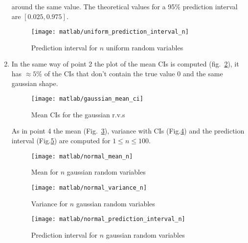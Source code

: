 \documentclass{article}
\begin{document}
\begin{enumerate}
  around the same value. The theoretical values for a 95\% prediction
  interval are $[0.025, 0.975]$.
  \begin{figure}[h]
    \centering
    \texttt{[image: matlab/uniform\_prediction\_interval\_n]}
    \caption{Prediction interval for $n$ uniform random variables}
    \label{pred_int_unif}
  \end{figure}
\item In the same way of point 2 the plot of the mean CIs is computed
  (fig.~\ref{gaussian_mean_ci}), it has $\approx 5\%$ of the CIs that
  don't contain the true value 0 and the same gaussian shape.
  \begin{figure}[h]
    \centering
    \texttt{[image: matlab/gaussian\_mean\_ci]}
    \caption{Mean CIs for the gaussian r.v.s}
    \label{gaussian_mean_ci}
  \end{figure}

  As in point 4 the mean (Fig.~\ref{gaussian_mean_n}), variance with
  CIs (Fig.\ref{gaussian_var_n}) and the prediction interval
  (Fig.\ref{gaussian_pred_int_n}) are computed for $1 \leq n \leq 100$.
  \begin{figure}[h]
    \centering
    \texttt{[image: matlab/normal\_mean\_n]}
    \caption{Mean for $n$ gaussian random variables}
    \label{gaussian_mean_n}
  \end{figure}
  \begin{figure}[h]
    \centering
    \texttt{[image: matlab/normal\_variance\_n]}
    \caption{Variance for $n$ gaussian random variables}
    \label{gaussian_var_n}
  \end{figure}
    \begin{figure}[h]
    \centering
    \texttt{[image: matlab/normal\_prediction\_interval\_n]}
    \caption{Prediction interval for $n$ gaussian random variables}
    \label{gaussian_pred_int_n}
  \end{figure}

\end{enumerate}
\end{document}
